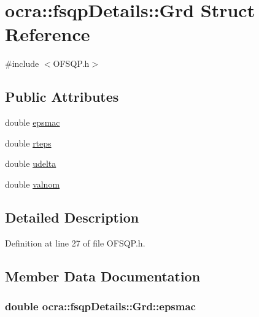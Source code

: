 \hypertarget{structocra_1_1fsqpDetails_1_1Grd}{}\section{ocra\+:\+:fsqp\+Details\+:\+:Grd Struct Reference}
\label{structocra_1_1fsqpDetails_1_1Grd}


{\ttfamily \#include $<$O\+F\+S\+Q\+P.\+h$>$}

\subsection*{Public Attributes}
\begin{DoxyCompactItemize}
\item 
double \hyperlink{structocra_1_1fsqpDetails_1_1Grd_ac683dea891e814e3f8dbb8e7e7ee513a}{epsmac}
\item 
double \hyperlink{structocra_1_1fsqpDetails_1_1Grd_ae0d611f0b701559540811d37c36dba6a}{rteps}
\item 
double \hyperlink{structocra_1_1fsqpDetails_1_1Grd_aa1e099590097141f48dc6445cbefd5b1}{udelta}
\item 
double \hyperlink{structocra_1_1fsqpDetails_1_1Grd_ab59ae66f9f4318da4a7b071ff2c9740a}{valnom}
\end{DoxyCompactItemize}


\subsection{Detailed Description}


Definition at line 27 of file O\+F\+S\+Q\+P.\+h.



\subsection{Member Data Documentation}
\subsubsection[{\texorpdfstring{epsmac}{epsmac}}]{\setlength{\rightskip}{0pt plus 5cm}double ocra\+::fsqp\+Details\+::\+Grd\+::epsmac}\hypertarget{structocra_1_1fsqpDetails_1_1Grd_ac683dea891e814e3f8dbb8e7e7ee513a}{}\label{structocra_1_1fsqpDetails_1_1Grd_ac683dea891e814e3f8dbb8e7e7ee513a}


